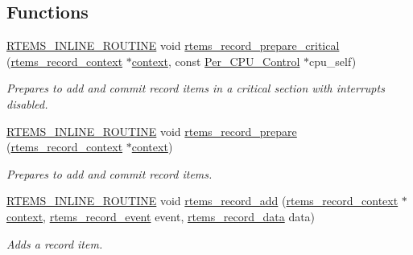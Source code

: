 \subsection*{Functions}
\begin{DoxyCompactItemize}
\item 
\mbox{\hyperlink{group__RTEMSScoreBaseDefs_gac216239df231d5dbd15e3520b0b9313f}{R\+T\+E\+M\+S\+\_\+\+I\+N\+L\+I\+N\+E\+\_\+\+R\+O\+U\+T\+I\+NE}} void \mbox{\hyperlink{group__RTEMSRecord_ga0a5b38b980ea05d87c3aa22844357575}{rtems\+\_\+record\+\_\+prepare\+\_\+critical}} (\mbox{\hyperlink{structrtems__record__context}{rtems\+\_\+record\+\_\+context}} $\ast$\mbox{\hyperlink{sun4u_2tte_8h_a9b4a99475e2709333b8e5d70483173f1}{context}}, const \mbox{\hyperlink{structPer__CPU__Control}{Per\+\_\+\+C\+P\+U\+\_\+\+Control}} $\ast$cpu\+\_\+self)
\begin{DoxyCompactList}\small\item\em Prepares to add and commit record items in a critical section with interrupts disabled. \end{DoxyCompactList}\item 
\mbox{\hyperlink{group__RTEMSScoreBaseDefs_gac216239df231d5dbd15e3520b0b9313f}{R\+T\+E\+M\+S\+\_\+\+I\+N\+L\+I\+N\+E\+\_\+\+R\+O\+U\+T\+I\+NE}} void \mbox{\hyperlink{group__RTEMSRecord_gad96c3279a0126090309e78135151168e}{rtems\+\_\+record\+\_\+prepare}} (\mbox{\hyperlink{structrtems__record__context}{rtems\+\_\+record\+\_\+context}} $\ast$\mbox{\hyperlink{sun4u_2tte_8h_a9b4a99475e2709333b8e5d70483173f1}{context}})
\begin{DoxyCompactList}\small\item\em Prepares to add and commit record items. \end{DoxyCompactList}\item 
\mbox{\hyperlink{group__RTEMSScoreBaseDefs_gac216239df231d5dbd15e3520b0b9313f}{R\+T\+E\+M\+S\+\_\+\+I\+N\+L\+I\+N\+E\+\_\+\+R\+O\+U\+T\+I\+NE}} void \mbox{\hyperlink{group__RTEMSRecord_ga5e164fc0a361be6cac976c3afa8ec732}{rtems\+\_\+record\+\_\+add}} (\mbox{\hyperlink{structrtems__record__context}{rtems\+\_\+record\+\_\+context}} $\ast$\mbox{\hyperlink{sun4u_2tte_8h_a9b4a99475e2709333b8e5d70483173f1}{context}}, \mbox{\hyperlink{group__RTEMSRecord_gac748f47c13acd7d0595694ed7f19074b}{rtems\+\_\+record\+\_\+event}} event, \mbox{\hyperlink{group__RTEMSRecord_gab483bd3ec735835dac6788b78c817eab}{rtems\+\_\+record\+\_\+data}} data)
\begin{DoxyCompactList}\small\item\em Adds a record item. \end{DoxyCompactList}\item 

\end{DoxyCompactItemize}
